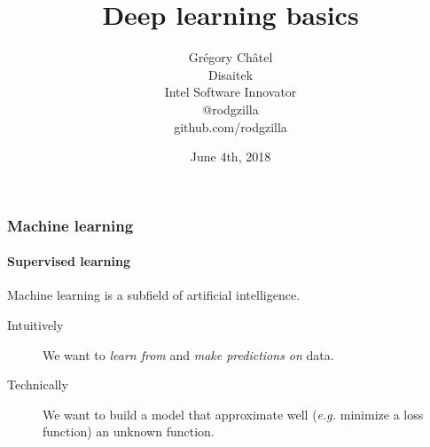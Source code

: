 \documentclass[9pt]{beamer}
\title{Deep learning basics}
\author[G. Châtel]{Grégory Châtel\\\vspace{0.3cm}Disaitek\\Intel Software Innovator\\\vspace{0.3cm}@rodgzilla\\github.com/rodgzilla}
\date{June 4th, 2018}
\begin{document}
\begin{frame}

  \maketitle

\end{frame}

\begin{frame}

  \frametitle{Machine learning}

  \framesubtitle{Supervised learning}

  Machine learning is a subfield of artificial intelligence.

  \bigskip

  \begin{description}
    \item[Intuitively] We want to \emph{learn from} and \emph{make predictions
    on} data.

    \medskip

    \item[Technically] We want to build a model that approximate well
      (\textit{e.g.} minimize a loss function) an unknown function.
  \end{description}
\end{frame}
\end{document}
